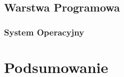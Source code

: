 \documentclass[eng,printmode]{mgr}
\begin{document}
\section{ Warstwa Programowa }
\subsection{System Operacyjny}

\chapter{ Podsumowanie }



\end{document}
